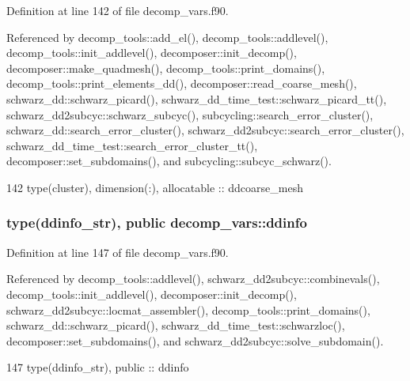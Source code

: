 Definition at line 142 of file decomp\+\_\+vars.\+f90.



Referenced by decomp\+\_\+tools\+::add\+\_\+el(), decomp\+\_\+tools\+::addlevel(), decomp\+\_\+tools\+::init\+\_\+addlevel(), decomposer\+::init\+\_\+decomp(), decomposer\+::make\+\_\+quadmesh(), decomp\+\_\+tools\+::print\+\_\+domains(), decomp\+\_\+tools\+::print\+\_\+elements\+\_\+dd(), decomposer\+::read\+\_\+coarse\+\_\+mesh(), schwarz\+\_\+dd\+::schwarz\+\_\+picard(), schwarz\+\_\+dd\+\_\+time\+\_\+test\+::schwarz\+\_\+picard\+\_\+tt(), schwarz\+\_\+dd2subcyc\+::schwarz\+\_\+subcyc(), subcycling\+::search\+\_\+error\+\_\+cluster(), schwarz\+\_\+dd\+::search\+\_\+error\+\_\+cluster(), schwarz\+\_\+dd2subcyc\+::search\+\_\+error\+\_\+cluster(), schwarz\+\_\+dd\+\_\+time\+\_\+test\+::search\+\_\+error\+\_\+cluster\+\_\+tt(), decomposer\+::set\+\_\+subdomains(), and subcycling\+::subcyc\+\_\+schwarz().


\begin{DoxyCode}
142   \textcolor{keywordtype}{type}(cluster), \textcolor{keywordtype}{dimension(:)}, \textcolor{keywordtype}{allocatable} :: ddcoarse_mesh
\end{DoxyCode}
\subsubsection[{ddinfo}]{\setlength{\rightskip}{0pt plus 5cm}type({\bf ddinfo\+\_\+str}), public decomp\+\_\+vars\+::ddinfo}\label{namespacedecomp__vars_acc535d987c862a824b1bd1509abbb09c}


Definition at line 147 of file decomp\+\_\+vars.\+f90.



Referenced by decomp\+\_\+tools\+::addlevel(), schwarz\+\_\+dd2subcyc\+::combinevals(), decomp\+\_\+tools\+::init\+\_\+addlevel(), decomposer\+::init\+\_\+decomp(), schwarz\+\_\+dd2subcyc\+::locmat\+\_\+assembler(), decomp\+\_\+tools\+::print\+\_\+domains(), schwarz\+\_\+dd\+::schwarz\+\_\+picard(), schwarz\+\_\+dd\+\_\+time\+\_\+test\+::schwarzloc(), decomposer\+::set\+\_\+subdomains(), and schwarz\+\_\+dd2subcyc\+::solve\+\_\+subdomain().


\begin{DoxyCode}
147   \textcolor{keywordtype}{type}(ddinfo_str), \textcolor{keywordtype}{public} :: ddinfo
\end{DoxyCode}
